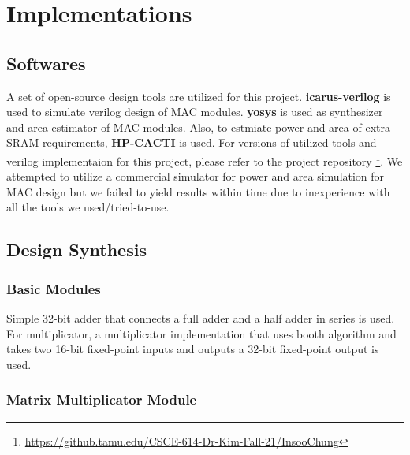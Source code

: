 \documentclass[11pt]{article}
\begin{document}
\section{Implementations}


\subsection{Softwares}

A set of open-source design tools are utilized for this project. \textbf{icarus-verilog} \cite{icarus} is used to simulate verilog design of MAC modules. \textbf{yosys} \cite{yosys} is used as synthesizer and area estimator of MAC modules. Also, to estmiate power and area of extra SRAM requirements, \textbf{HP-CACTI} \cite{hp-cacti} is used. For versions of utilized tools and verilog implementaion for this project, please refer to the project repository \footnote{\url{https://github.tamu.edu/CSCE-614-Dr-Kim-Fall-21/InsooChung}}. We attempted to utilize a commercial simulator for power and area simulation for MAC design but we failed to yield results within time due to inexperience with all the tools we used/tried-to-use.

\subsection{Design Synthesis}

\subsubsection{Basic Modules}

Simple 32-bit adder that connects a full adder and a half adder in series is used. For multiplicator, a multiplicator implementation that uses booth algorithm and takes two 16-bit fixed-point inputs and outputs a 32-bit fixed-point output is used.

\subsubsection{Matrix Multiplicator Module}
\end{document}
